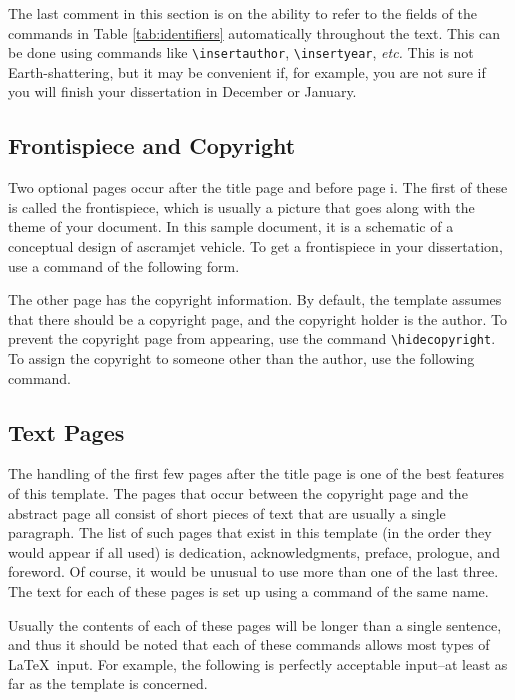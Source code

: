 \documentclass[thesis]{./tex/thesis-umich}
\begin{document}
The last comment in this section is on the ability to refer to the
fields of the commands in Table \ref{tab:identifiers} automatically
throughout the text.  This can be done using commands like
\verb|\insertauthor|, \verb|\insertyear|, \textit{etc.}  This is not
Earth-shattering, but it may be convenient if, for example, you are
not sure if you will finish your dissertation in December or January.

\subsection{Frontispiece and Copyright}
Two optional pages occur after the title page and before page i.  The
first of these is called the frontispiece, which is usually a picture
that goes along with the theme of your document.  In this sample
document, it is a schematic of a conceptual design of ascramjet vehicle.
To get a frontispiece in your dissertation, use a command of the
following form.
\begin{code}
\frontispiece{\texttt{[image: ...]}}
\end{code}

The other page has the copyright information.  By default, the template
assumes that there should be a copyright page, and the copyright
holder is the author.  To prevent the copyright page from appearing,
use the command \verb|\hidecopyright|.  To assign the copyright to
someone other than the author, use the following command.
\begin{code}
\end{code}


\subsection{Text Pages}  \label{ssec:dedication}
The handling of the first few pages after the title page is one of the
best features of this template.  The pages that occur between the
copyright page and the abstract page all consist of short pieces of text
that are usually a single paragraph.  The list of such pages that exist
in this template (in the order they would appear if all used) is
dedication, acknowledgments, preface, prologue, and foreword.  Of
course, it would be unusual to use more than one of the last three.
The text for each of these pages is set up using a command of the same
name.
\begin{code}
\end{code}
Usually the contents of each of these pages will be longer than a single
sentence, and thus it should be noted that each of these commands allows
most types of \LaTeX~input.  For example, the following is perfectly
acceptable input--at least as far as the template is concerned.
\begin{code}
\end{code}
\end{document}
